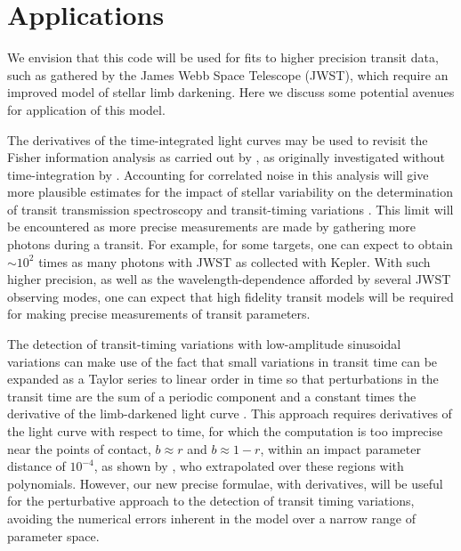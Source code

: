 \documentclass[modern]{aastex61}
\begin{document}

\section{Applications}

We envision that this code will be used for fits to higher precision
transit data, such as gathered by the James Webb Space Telescope (JWST),
which require an improved model of stellar limb darkening.  Here we discuss
some potential avenues for application of this model.

The derivatives of the time-integrated light curves may be used to revisit the
Fisher information analysis as carried out by \citet{Price2014}, as originally
investigated without time-integration by \citet{Carter2008}.  Accounting
for correlated noise in this analysis will give more plausible estimates
for the impact of stellar variability on the determination of transit
transmission spectroscopy and transit-timing variations \citep{ForemanMackey2017}.
This limit will be encountered as more precise measurements are made by gathering
more photons during a transit.  For example, for some targets, one can expect to
obtain $\sim 10^2$ times as many photons with JWST as collected with Kepler.
With such higher precision, as well as the wavelength-dependence afforded
by several JWST observing modes, one can expect that high fidelity transit
models will be required for making precise measurements of transit parameters.

The detection of transit-timing variations with low-amplitude sinusoidal
variations can make use of the fact that small variations in transit time
can be expanded as a Taylor series to linear order in time so that perturbations
in the transit time are the sum of a periodic component and a constant
times the derivative of the limb-darkened light curve \citep{Ofir2018}.
This approach requires derivatives of the light curve with respect to
time, for which the \citet{MandelAgol2002} computation is too
imprecise near the points of contact, $b \approx r$ and $b \approx 1-r$,
within an impact parameter distance of $10^{-4}$, as shown by \citet{Ofir2018},
who extrapolated over these regions with polynomials.
However, our new precise formulae, with derivatives, will be useful
for the perturbative approach to the detection of transit timing
variations, avoiding the numerical errors inherent in the \citet{MandelAgol2002}
model over a narrow range of parameter space.
\end{document}
